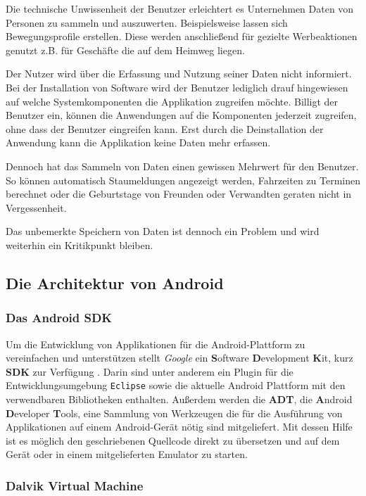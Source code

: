 Die technische Unwissenheit der Benutzer erleichtert es Unternehmen Daten von Personen zu sammeln und auszuwerten. Beispielsweise lassen sich Bewegungsprofile erstellen. Diese werden anschließend für gezielte Werbeaktionen genutzt z.B. für Geschäfte die auf dem Heimweg liegen.

Der Nutzer wird über die Erfassung und Nutzung seiner Daten nicht informiert. Bei der Installation von Software wird der Benutzer lediglich drauf hingewiesen auf welche Systemkomponenten die Applikation zugreifen möchte. Billigt der Benutzer ein, können die Anwendungen auf die Komponenten jederzeit zugreifen, ohne dass der Benutzer eingreifen kann. Erst durch die Deinstallation der Anwendung kann die Applikation keine Daten mehr erfassen.

Dennoch hat das Sammeln von Daten einen gewissen Mehrwert für den Benutzer. So können automatisch Staumeldungen angezeigt werden, Fahrzeiten zu Terminen berechnet oder die Geburtstage von Freunden oder Verwandten geraten nicht in Vergessenheit.

Das unbemerkte Speichern von Daten ist dennoch ein Problem und wird weiterhin ein Kritikpunkt bleiben.

\subsection{Die Architektur von Android}

\subsubsection{Das Android SDK}

Um die Entwicklung von Applikationen für die Android-Plattform zu vereinfachen und unterstützen stellt \emph{Google} ein \textbf{S}oftware \textbf{D}evelopment \textbf{K}it, kurz \textbf{SDK} zur Verfügung \cite{android_sdk}. Darin sind unter anderem ein Plugin für die Entwicklungsumgebung \verb+Eclipse+ sowie die aktuelle Android Plattform mit den verwendbaren Bibliotheken enthalten. Außerdem werden die \textbf{ADT}, die \textbf{A}ndroid \textbf{D}eveloper \textbf{T}ools, eine Sammlung von Werkzeugen die für die Ausführung von Applikationen auf einem Android-Gerät nötig sind mitgeliefert. Mit dessen Hilfe ist es möglich den geschriebenen Quellcode direkt zu übersetzen und auf dem Gerät oder in einem mitgelieferten Emulator zu starten.

\subsubsection{Dalvik Virtual Machine}

